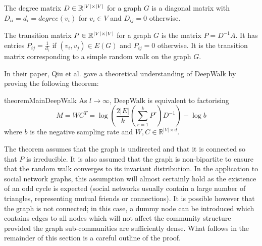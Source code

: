 \documentclass[a4paper]{article}
\begin{document}
\begin{definition}
  The degree matrix $D \in \R^{|V| \times |V|}$ for a graph $G$ is a diagonal
  matrix with $D_{ii} = d_i = degree(v_i)$ for $v_i \in V$ and $D_{ij} = 0$ otherwise.
\end{definition}

\begin{definition}
  The transition matrix $P \in \R^{|V| \times |V|}$ for a graph $G$ is the
  matrix $P = D^{-1}A$. It has entries $P_{ij} = \frac{1}{d_i}$ if $(v_i, v_j)
  \in E(G)$ and $P_{ij} = 0$ otherwise. It is the transition matrix
  corresponding to a simple random walk on the graph $G$. 
\end{definition}
In their paper, Qiu et al. gave a theoretical understanding of DeepWalk by proving the following theorem:
\begin{restatable}{theorem}{MainDeepWalk}
  As $l \to \infty$, DeepWalk is equivalent to factorising
  \[M = WC^T = \log{\left(\frac{2|E|}{k}\left( \sum_{r = 1}^k P^r  \right) D^{-1}
      \right)} - \log{b}\]
  where $b$ is the negative sampling rate and $W, C \in \mathbb{R}^{|V| \times d}$.
\end{restatable}
\noindent The theorem assumes that the graph is undirected and that it is connected so
that $P$ is irreducible. It is also assumed that the graph is
non-bipartite to ensure that the random walk converges to its invariant distribution. In the application to
social network graphs, this
assumption will almost certainly hold as the existence of an odd cycle is
expected (social networks usually contain a large number of triangles,
representing mutual friends or connections). It is possible however that the
graph is not connected; in this case, a dummy node can be introduced which
contains edges to all nodes which will not affect the community structure
provided the graph sub-communities are sufficiently dense.
What follows in the remainder of this section is a careful outline of the proof.
\end{document}

